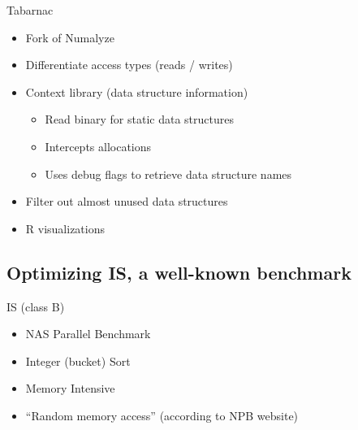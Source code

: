 \documentclass[xcolor={usenames,dvipsnames},hyperref={pdfusetitle}]{beamer}
\begin{document}
\begin{frame}{Tabarnac}
    \begin{exampleblock}{}
        \begin{itemize}
            \item Fork of Numalyze
            \item Differentiate access types (reads / writes)
            \item Context library (data structure information)
                \begin{itemize}
                    \item Read binary for static data structures
                    \item Intercepts allocations
                    \item Uses debug flags to retrieve data structure names
                \end{itemize}
            \item Filter out almost unused data structures
            \item R visualizations
        \end{itemize}
    \end{exampleblock}
\end{frame}

\subsection{Optimizing IS, a well-known benchmark}

\begin{frame}{IS (class B)}
    \begin{block}{}
        \begin{itemize}
            \item NAS Parallel Benchmark~\cite{Jin99NPBOpenMP}
            \item Integer (bucket) Sort
            \item Memory Intensive
            \item<alert@1-> “Random memory access” (according to NPB website)
        \end{itemize}
    \end{block}
\end{frame}
\end{document}
